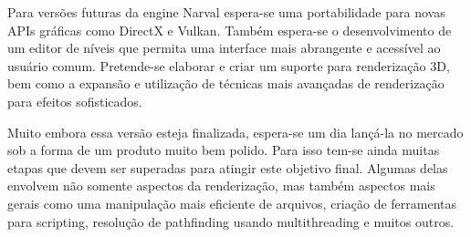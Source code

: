 \documentclass[12pt, 
openright, 
oneside, 
a4paper,    
brazil]{facom-ufu-abntex2}
\begin{document}
Para versões futuras da engine Narval espera-se uma portabilidade para novas APIs gráficas como DirectX e Vulkan. Também espera-se o desenvolvimento de um editor de níveis que permita uma interface mais abrangente e acessível ao usuário comum. Pretende-se elaborar e criar um suporte para renderização 3D, bem como a expansão e utilização de técnicas mais avançadas de renderização para efeitos sofisticados.

Muito embora essa versão esteja finalizada, espera-se um dia lançá-la no mercado sob a forma de um produto muito bem polido. Para isso tem-se ainda muitas etapas que devem ser superadas para atingir este objetivo final. Algumas delas envolvem não somente aspectos da renderização, mas também aspectos mais gerais como uma manipulação mais eficiente de arquivos, criação de ferramentas para scripting, resolução de pathfinding usando multithreading e muitos outros.





\postextual




\end{document}
